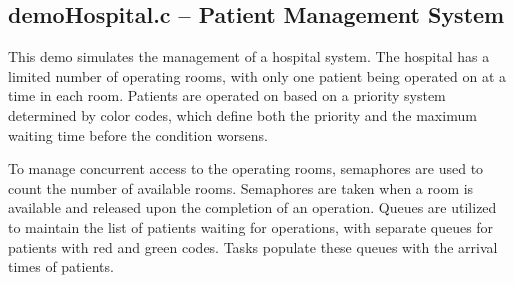 \documentclass[a4paper, 10pt, oneside]{article} %
\begin{document}
\begin{comment}
    \begin{lstlisting}[language=C, caption={Main function}]
void demo4() {
    /* Populate matrix A */
...
    /* Populate matrix B */
...
    /* Create tasks for each row of matrix A */
    for (int i = 0; i < A_ROWS; i++) {
        for (int j = 0; j < B_COLS; j++) {
            t_mat *data = (t_mat *)pvPortMalloc(sizeof(t_mat));
            data->row = i;
            data->col = j;
            xTaskCreate(vTaskProduct, "product", configMINIMAL_STACK_SIZE, (void *)data, tskIDLE_PRIORITY + 1, NULL);
        }
    }

    /* Create task to print the result matrix */
    xTaskCreate(vTaskPrint, "print", configMINIMAL_STACK_SIZE, NULL, tskIDLE_PRIORITY + 1, NULL);

    /* Starting FreeRTOS scheduler */
    vTaskStartScheduler();

    for(;;);
}

\end{lstlisting}

\begin{lstlisting}[language=C, caption={Task for matrix multiplication}]

void vTaskProduct(void *data) {
    t_mat *params = (t_mat *)data;
    int row = params->row;
    int col = params->col;
   
    int sum = 0;
    for (int i = 0; i < A_COLS; i++) {
        sum += A[row][i] * B[i][col];
    }
    C[row][col] = sum;

    vTaskDelete(NULL);
}


\end{lstlisting}
\end{comment}

\subsection{demoHospital.c -- Patient Management System}
\label{section:demoHospital}

This demo simulates the management of a hospital system. The hospital has a limited number of operating rooms, with only one patient being operated on at a time in each room. Patients are operated on based on a priority system determined by color codes, which define both the priority and the maximum waiting time before the condition worsens.

To manage concurrent access to the operating rooms, semaphores are used to count the number of available rooms. Semaphores are taken when a room is available and released upon the completion of an operation. Queues are utilized to maintain the list of patients waiting for operations, with separate queues for patients with red and green codes. Tasks populate these queues with the arrival times of patients.
\end{document}

